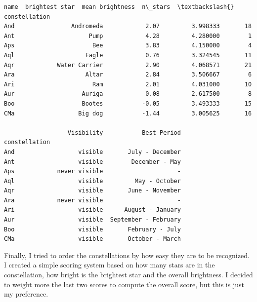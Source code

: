 \documentclass[11pt]{article}
\makeatletter
\newcommand{\boxspacing}{\kern\kvtcb@left@rule\kern\kvtcb@boxsep}
\newcommand{\prompt}[4]{
        {\ttfamily\llap{{\color{#2}[#3]:\hspace{3pt}#4}}\vspace{-\baselineskip}}
    }
\makeatother
\begin{document}
            \begin{tcolorbox}[breakable, size=fbox, boxrule=.5pt, pad at break*=1mm, opacityfill=0]
\prompt{Out}{outcolor}{51}{\boxspacing}
\begin{Verbatim}[commandchars=\\\{\}]
                        name  brightest star  mean brightness  n\_stars  \textbackslash{}
constellation
And                Andromeda            2.07         3.998333       18
Ant                     Pump            4.28         4.280000        1
Aps                      Bee            3.83         4.150000        4
Aql                    Eagle            0.76         3.324545       11
Aqr            Water Carrier            2.90         4.068571       21
Ara                    Altar            2.84         3.506667        6
Ari                      Ram            2.01         4.031000       10
Aur                   Auriga            0.08         2.617500        8
Boo                   Bootes           -0.05         3.493333       15
CMa                  Big dog           -1.44         3.005625       16

                  Visibility           Best Period
constellation
And                  visible       July - December
Ant                  visible        December - May
Aps            never visible                     -
Aql                  visible         May - October
Aqr                  visible       June - November
Ara            never visible                     -
Ari                  visible      August - January
Aur                  visible  September - February
Boo                  visible       February - July
CMa                  visible       October - March
\end{Verbatim}
\end{tcolorbox}
        
    Finally, I tried to order the constellations by how easy they are to be
recognized. I created a simple scoring system based on how many stars
are in the constellation, how bright is the brightest star and the
overall brightness. I decided to weight more the last two scores to
compute the overall score, but this is just my preference.
\end{document}
